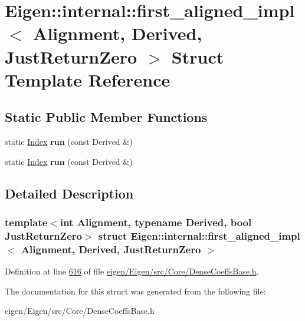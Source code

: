 \hypertarget{struct_eigen_1_1internal_1_1first__aligned__impl}{}\section{Eigen\+:\+:internal\+:\+:first\+\_\+aligned\+\_\+impl$<$ Alignment, Derived, Just\+Return\+Zero $>$ Struct Template Reference}
\label{struct_eigen_1_1internal_1_1first__aligned__impl}
\subsection*{Static Public Member Functions}
\begin{DoxyCompactItemize}
\item 
\mbox{\label{struct_eigen_1_1internal_1_1first__aligned__impl_ac8e3cc0611b600f623f710c1531740b2}} 
static \hyperlink{namespace_eigen_a62e77e0933482dafde8fe197d9a2cfde}{Index} {\bfseries run} (const Derived \&)
\item 
\mbox{\label{struct_eigen_1_1internal_1_1first__aligned__impl_ac8e3cc0611b600f623f710c1531740b2}} 
static \hyperlink{namespace_eigen_a62e77e0933482dafde8fe197d9a2cfde}{Index} {\bfseries run} (const Derived \&)
\end{DoxyCompactItemize}


\subsection{Detailed Description}
\subsubsection*{template$<$int Alignment, typename Derived, bool Just\+Return\+Zero$>$\newline
struct Eigen\+::internal\+::first\+\_\+aligned\+\_\+impl$<$ Alignment, Derived, Just\+Return\+Zero $>$}



Definition at line \hyperlink{eigen_2_eigen_2src_2_core_2_dense_coeffs_base_8h_source_l00616}{616} of file \hyperlink{eigen_2_eigen_2src_2_core_2_dense_coeffs_base_8h_source}{eigen/\+Eigen/src/\+Core/\+Dense\+Coeffs\+Base.\+h}.



The documentation for this struct was generated from the following file\+:\begin{DoxyCompactItemize}
\item 
eigen/\+Eigen/src/\+Core/\+Dense\+Coeffs\+Base.\+h\end{DoxyCompactItemize}
